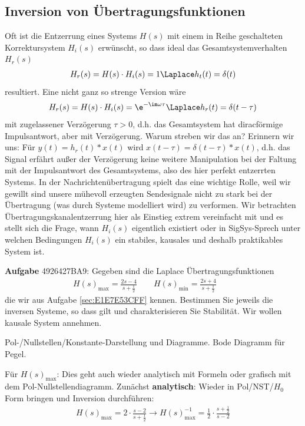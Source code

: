 \newpage
\subsection{Inversion von Übertragungsfunktionen}
\label{sec:4926427BA9}
\begin{Ziel}
Oft ist die Entzerrung eines Systems $H(s)$ mit einem in Reihe
geschalteten Korrektursystem $H_i(s)$
erwünscht, so dass ideal das Gesamtsystemverhalten $H_r(s)$
\begin{align}
\label{eq:4926427BA9_EQing}
  H_r(s) = H(s)\cdot H_i(s) = 1 \Laplace h_t(t)=\delta(t)
\end{align}
resultiert.
Eine nicht ganz so strenge Version wäre
\begin{align}
  H_r(s) = H(s)\cdot H_i(s) = \e^{-\im\omega\tau} \Laplace h_r(t)=\delta(t-\tau)
\end{align}
mit zugelassener Verzögerung $\tau>0$, d.h. das Gesamtsystem hat diracförmige
Impulsantwort, aber mit Verzögerung. Warum streben wir das an? Erinnern wir uns:
Für $y(t) = h_r(t)\ast x(t)$ wird $x(t-\tau) = \delta(t-\tau)\ast x(t)$, d.h.
das Signal erfährt außer der Verzögerung keine weitere Manipulation bei der Faltung
mit der Impulsantwort des Gesamtsystems, also des hier perfekt entzerrten Systems.
In der Nachrichtenübertragung spielt das eine wichtige Rolle, weil wir
gewillt sind unsere mühevoll erzeugten Sendesignale nicht zu stark
bei der Übertragung (was durch Systeme modelliert wird) zu verformen.
Wir betrachten Übertragungskanalentzerrung hier als Einstieg extrem vereinfacht mit
 und es stellt sich die Frage, wann $H_i(s)$ eigentlich
existiert oder in SigSys-Sprech unter welchen Bedingungen $H_i(s)$
ein stabiles, kausales und deshalb praktikables System ist.
\end{Ziel}
\textbf{Aufgabe} {\tiny 4926427BA9}: Gegeben sind die Laplace
Übertragungsfunktionen
\begin{align}
H(s)_\mathrm{max} = \frac{2 s-4}{s+\frac{1}{2}}\qquad
H(s)_\mathrm{min} = \frac{2 s+4}{s+\frac{1}{2}}\qquad
\end{align}
die wir aus Aufgabe \ref{sec:E1E7E53CFF} kennen.
Bestimmen Sie jeweils die inversen Systeme, so dass  gilt
und charakterisieren Sie Stabilität. Wir wollen kausale System annehmen.

\begin{Werkzeug}
Pol-/Nullstellen/Konstante-Darstellung und Diagramme. Bode Diagramm für Pegel.
\end{Werkzeug}
\begin{Ansatz}
Für $H(s)_\mathrm{max}$:
Dies geht auch wieder analytisch mit Formeln oder grafisch mit dem
Pol-Nullstellendiagramm.
Zunächst \textbf{analytisch}:
Wieder in Pol/NST/$H_0$ Form bringen und Inversion durchführen:
\begin{align}
H(s)_\mathrm{max} = 2\cdot\frac{s-2}{s+\frac{1}{2}}\rightarrow
H(s)_\mathrm{max}^{-1} = \frac{1}{2}\cdot\frac{s+\frac{1}{2}}{s-2}
\end{align}
\end{Ansatz}

